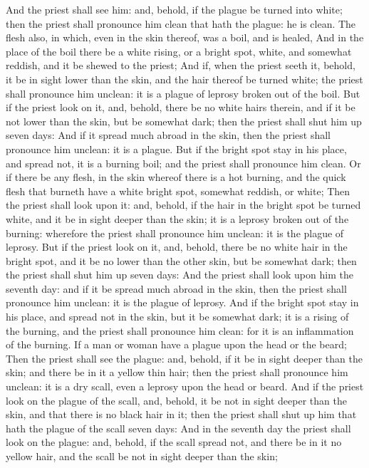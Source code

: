\begin{biblechapter}
\verse And the priest shall see him: and, behold, if the plague be turned into white; then the priest shall pronounce him clean that hath the plague: he is clean.
\verse The flesh also, in which, even in the skin thereof, was a boil, and is healed,
\verse And in the place of the boil there be a white rising, or a bright spot, white, and somewhat reddish, and it be shewed to the priest;
\verse And if, when the priest seeth it, behold, it be in sight lower than the skin, and the hair thereof be turned white; the priest shall pronounce him unclean: it is a plague of leprosy broken out of the boil.
\verse But if the priest look on it, and, behold, there be no white hairs therein, and if it be not lower than the skin, but be somewhat dark; then the priest shall shut him up seven days:
\verse And if it spread much abroad in the skin, then the priest shall pronounce him unclean: it is a plague.
\verse But if the bright spot stay in his place, and spread not, it is a burning boil; and the priest shall pronounce him clean.
\verse Or if there be any flesh, in the skin whereof there is a hot burning, and the quick flesh that burneth have a white bright spot, somewhat reddish, or white;
\verse Then the priest shall look upon it: and, behold, if the hair in the bright spot be turned white, and it be in sight deeper than the skin; it is a leprosy broken out of the burning: wherefore the priest shall pronounce him unclean: it is the plague of leprosy.
\verse But if the priest look on it, and, behold, there be no white hair in the bright spot, and it be no lower than the other skin, but be somewhat dark; then the priest shall shut him up seven days:
\verse And the priest shall look upon him the seventh day: and if it be spread much abroad in the skin, then the priest shall pronounce him unclean: it is the plague of leprosy.
\verse And if the bright spot stay in his place, and spread not in the skin, but it be somewhat dark; it is a rising of the burning, and the priest shall pronounce him clean: for it is an inflammation of the burning.
\verse If a man or woman have a plague upon the head or the beard;
\verse Then the priest shall see the plague: and, behold, if it be in sight deeper than the skin; and there be in it a yellow thin hair; then the priest shall pronounce him unclean: it is a dry scall, even a leprosy upon the head or beard.
\verse And if the priest look on the plague of the scall, and, behold, it be not in sight deeper than the skin, and that there is no black hair in it; then the priest shall shut up him that hath the plague of the scall seven days:
\verse And in the seventh day the priest shall look on the plague: and, behold, if the scall spread not, and there be in it no yellow hair, and the scall be not in sight deeper than the skin;

\end{biblechapter}
